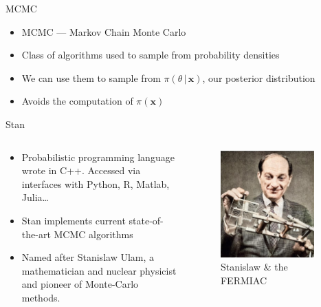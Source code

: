\documentclass[aspectratio=169]{beamer}
\begin{document}
\begin{frame}{MCMC}
  \begin{itemize}
    \item MCMC --- Markov Chain Monte Carlo
    \item Class of algorithms used to sample from probability densities
    \item We can use them to sample from $\pi(\theta \, | \, \bm{x})$, our
      posterior distribution
    \item Avoids the computation of $\pi(\bm{x})$
  \end{itemize}
\end{frame}

\begin{frame}{Stan}
  \begin{columns}
    \begin{column}{0.6\textwidth}
      \begin{itemize}
        \item Probabilistic programming language wrote in C++. Accessed via
          interfaces with Python, R, Matlab, Julia\ldots
        \item Stan implements current state-of-the-art MCMC algorithms
        \item Named after Stanislaw Ulam, a mathematician and nuclear physicist and
          pioneer of Monte-Carlo methods.
      \end{itemize}
    \end{column}
    \begin{column}{0.4\textwidth}
      \begin{figure}
        \includegraphics[width=0.9\textwidth]{stan.jpg}
        \caption{Stanislaw \& the FERMIAC}
      \end{figure}
    \end{column}
  \end{columns}
\end{frame}
\end{document}
